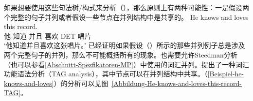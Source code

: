\begin{exe}
\begin{xlist}[iv.]
\begin{exe}
\begin{xlist}[iv.]
如果想要使用这些句法树/构式来分析（），那么原则上有两种可能性：一是假设两个完整的句子并列或者假设一些节点在并列结构中是共享的。
\ea
\label{Beispiel-he-knows-and-loves}
\gll He knows and loves this record.\\
     他 知道 并且 喜欢 DET 唱片\\
\glt `他知道并且喜欢这张唱片。'
\z
%
%
%
\citet{Abeille2006a}已经证明如果假设（）所示的那些并列例子总是涉及两个完整句子的并列，那么不可能概括所有的现象。也需要允许Steedman分析（也可以参看\ref{Abschnitt-Spezfikatoren-MP}）中使用的词汇并列。\citet{SJ96a}提出了一种词汇功能语法分析\indextagc（TAG analysis），其中节点可以在并列结构中共享。（\ref{Beispiel-he-knows-and-loves}）的分析可以见图~\vref{Abbildung-He-knows-and-loves-this-record-TAG}。

\end{xlist}
\end{exe}
\end{xlist}
\end{exe}
